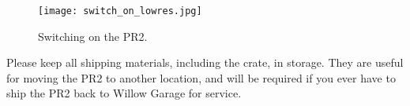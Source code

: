 \begin{figure}[h]
\centering
\texttt{[image: switch\_on\_lowres.jpg]}
\caption{Switching on the PR2.}
\label{fig:switch_on}
\end{figure}

Please keep all shipping materials, including the crate, in storage.  They are useful for
moving the PR2 to another location, and will be required if you ever have to ship the PR2
back to Willow Garage for service.

